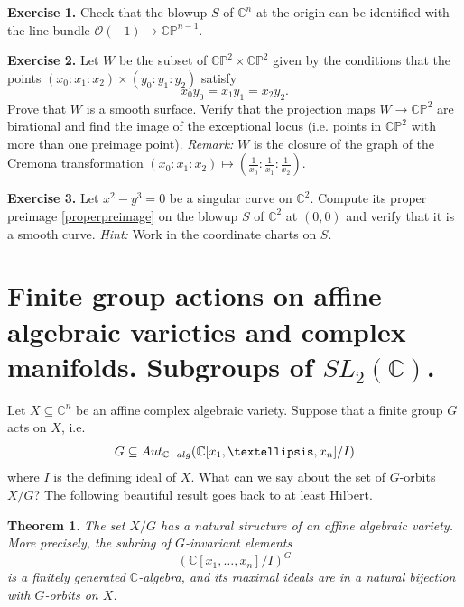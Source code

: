 \documentclass[11pt]{article}
\numberwithin{equation}{section}
\numberwithin{footnote}{section}
\newtheorem{thm}{Theorem}[section]
\renewcommand{\P}{{\mathbb P}}
\newcommand{\C}{{\mathbb C}}
\begin{document}
{\bf Exercise 1.} Check that the blowup $S$ of $\C^n$ at the origin can be identified with the line bundle $\mathcal O(-1)\to \C\P^{n-1}$.

{\bf Exercise 2.} Let $W$ be the subset of $\C\P^2\times \C\P^2$ given by the conditions that the points $(x_0:x_1:x_2)\times (y_0:y_1:y_2)$ 
satisfy
$$
x_0 y_0 = x_1 y_1 = x_2 y_2.
$$
Prove that $W$ is a smooth surface. Verify that the projection maps $W\to \C\P^2$ are birational and find the image of the exceptional locus (i.e. points in $\C\P^2$ with more than one preimage point). \emph{Remark:} $W$ is the closure of the graph of the Cremona transformation $(x_0:x_1:x_2)\mapsto (\frac 1{x_0}:\frac 1{x_1}:\frac 1{x_2})$.

{\bf Exercise 3.} Let $x^2-y^3=0$ be a singular curve on $\C^2$. Compute its proper preimage \eqref{properpreimage} on the blowup $S$ of $\C^2$ at $(0,0)$ and verify that it is a smooth curve. \emph{Hint:} Work in the coordinate charts on $S$.



\section{Finite group actions on affine algebraic varieties and complex manifolds. Subgroups of $SL_2(\C)$.}
Let $X\subseteq \C^n$ be an affine complex algebraic variety. Suppose that a finite group $G$ acts on $X$, 
i.e. 
$$
G\subseteq {\rm Aut}_{\C-{\rm alg}}(\C[x_1,\ldots,x_n]/I)
$$
where $I$ is the defining ideal of $X$.
What can we say about the set of $G$-orbits $X/G$? The following beautiful result goes back to at least Hilbert.

\smallskip
\begin{thm}\label{XG}
The set $X/G$ has a natural structure of an affine algebraic variety. More precisely, the subring of $G$-invariant elements
$$
(\C[x_1,\ldots,x_n]/I)^G
$$
is a finitely generated $\C$-algebra, and its maximal ideals are in a natural bijection with $G$-orbits on $X$.
\end{thm}
\end{document}
